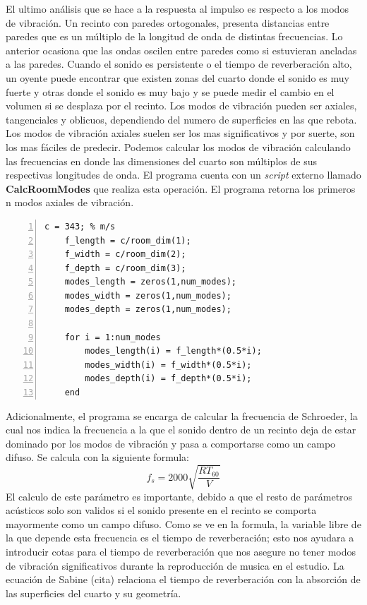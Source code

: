 El ultimo análisis que se hace a la respuesta al impulso es respecto a los modos de vibración. Un recinto con paredes ortogonales, presenta distancias entre paredes que es un múltiplo de la longitud de onda de distintas frecuencias. Lo anterior ocasiona que las ondas oscilen entre paredes como si estuvieran ancladas a las paredes. Cuando el sonido es persistente o el tiempo de reverberación alto, un oyente puede encontrar que existen zonas del cuarto donde el sonido es muy fuerte y otras donde el sonido es muy bajo y se puede medir el cambio en el volumen si se desplaza por el recinto. \hfill\break
Los modos de vibración pueden ser axiales, tangenciales y oblicuos, dependiendo del numero de superficies en las que rebota. Los modos de vibración axiales suelen ser los mas significativos y por suerte, son los mas fáciles de predecir. \hfill\break
Podemos calcular los modos de vibración calculando las frecuencias en donde las dimensiones del cuarto son múltiplos de sus respectivas longitudes de onda. El programa cuenta con un \textit{script} externo llamado \textbf{CalcRoomModes} que realiza esta operación. El programa retorna los primeros n modos axiales de vibración.
\begin{lstlisting}[frame=single,numbers=left, style=Matlab-editor, basicstyle=\tiny]
    c = 343; % m/s
    f_length = c/room_dim(1);
    f_width = c/room_dim(2);
    f_depth = c/room_dim(3);
    modes_length = zeros(1,num_modes);
    modes_width = zeros(1,num_modes);
    modes_depth = zeros(1,num_modes);

    for i = 1:num_modes
        modes_length(i) = f_length*(0.5*i); 
        modes_width(i) = f_width*(0.5*i);
        modes_depth(i) = f_depth*(0.5*i);
    end
\end{lstlisting}
Adicionalmente, el programa se encarga de calcular la frecuencia de Schroeder, la cual nos indica la frecuencia a la que el sonido dentro de un recinto deja de estar dominado por los modos de vibración y pasa a comportarse como un campo difuso. Se calcula con la siguiente formula:
$$f_s = 2000\sqrt{\frac{RT_{60}}{V}}$$
El calculo de este parámetro es importante, debido a que el resto de parámetros acústicos solo son validos si el sonido presente en el recinto se comporta mayormente como un campo difuso. Como se ve en la formula, la variable libre de la que depende esta frecuencia es el tiempo de reverberación; esto nos ayudara a introducir cotas para el tiempo de reverberación que nos asegure no tener modos de vibración significativos durante la reproducción de musica en el estudio.
La ecuación de Sabine (cita) relaciona el tiempo de reverberación con la absorción de las superficies del cuarto y su geometría. 
